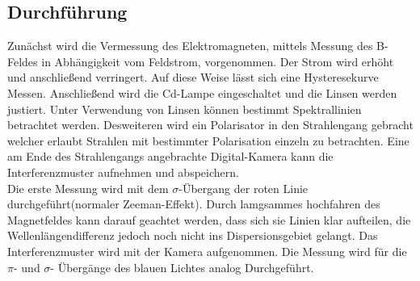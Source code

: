 \subsection{Durchführung}
Zunächst wird die Vermessung des Elektromagneten, mittels Messung des B-Feldes in Abhängigkeit vom Feldstrom, vorgenommen.
Der Strom wird erhöht und anschließend verringert. Auf diese Weise lässt sich eine Hysteresekurve Messen.
Anschließend wird die Cd-Lampe eingeschaltet und die Linsen werden justiert.
Unter Verwendung von Linsen können bestimmt Spektrallinien betrachtet werden.
Desweiteren wird ein Polarisator in den Strahlengang gebracht welcher erlaubt Strahlen mit bestimmter Polarisation einzeln zu betrachten.
Eine am Ende des Strahlengangs angebrachte Digital-Kamera kann die Interferenzmuster aufnehmen und abspeichern.\\

Die erste Messung wird mit dem $\sigma$-Übergang der roten Linie durchgeführt(normaler Zeeman-Effekt).
Durch lamgsammes hochfahren des Magnetfeldes kann darauf geachtet werden, dass sich sie Linien klar aufteilen, die Wellenlängendifferenz jedoch noch nicht ins Dispersionsgebiet gelangt.
Das Interferenzmuster wird mit der Kamera aufgenommen.
Die Messung wird für die $\pi$- und $\sigma$- Übergänge des blauen Lichtes analog Durchgeführt.
